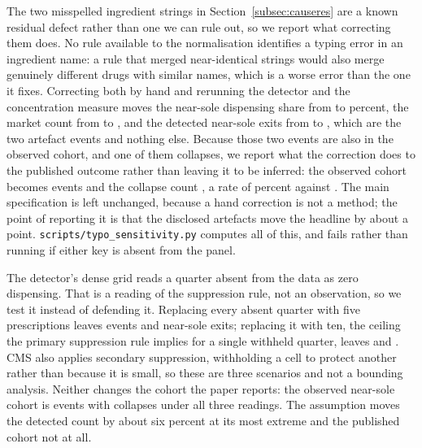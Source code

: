 \documentclass[pdflatex,sn-vancouver-num,Numbered]{sn-jnl}
\begin{document}
The two misspelled ingredient strings in Section~\ref{subsec:causeres} are a known residual
defect rather than one we can rule out, so we report what correcting them does. No rule available
to the normalisation identifies a typing error in an ingredient name: a rule that merged
near-identical strings would also merge genuinely different drugs with similar names, which is a
worse error than the one it fixes. Correcting both by hand and rerunning the detector and the
concentration measure moves the near-sole dispensing share from \nTypoVolBase to \nTypoVolFixed
percent, the market count from \nTypoMarketsBase to \nTypoMarketsFixed, and the detected
near-sole exits from \nTypoExitsBase to \nTypoExitsFixed, which are the two artefact events and
nothing else. Because those two events are also in the observed cohort, and one of them
collapses, we report what the correction does to the published outcome rather than leaving it to
be inferred: the observed cohort becomes \nTypoObsFixedW events and the collapse count
\nTypoCollFixedW, a rate of \nTypoRateFixed percent against \nTypoRateBase. The main
specification is left unchanged, because a hand correction is not a method; the point of
reporting it is that the disclosed artefacts move the headline by about a point.
\texttt{scripts/typo\_sensitivity.py} computes all of this, and fails rather than running if
either key is absent from the panel.

The detector's dense grid reads a quarter absent from the data as zero dispensing. That is a
reading of the suppression rule, not an observation, so we test it instead of defending it.
Replacing every absent quarter with five prescriptions leaves \nFillFiveEvents events and
\nFillFiveSole near-sole exits; replacing it with ten, the ceiling the primary suppression rule
implies for a single withheld quarter, leaves \nFillTenEvents and \nFillTenSole. CMS also applies
secondary suppression, withholding a cell to protect another rather than because it is small, so
these are three scenarios and not a bounding analysis. Neither changes the
cohort the paper reports: the observed near-sole cohort is \nFillObserved events with
\nFillCollapsed collapses under all three readings. The assumption moves the detected count by
about six percent at its most extreme and the published cohort not at all.
\end{document}
